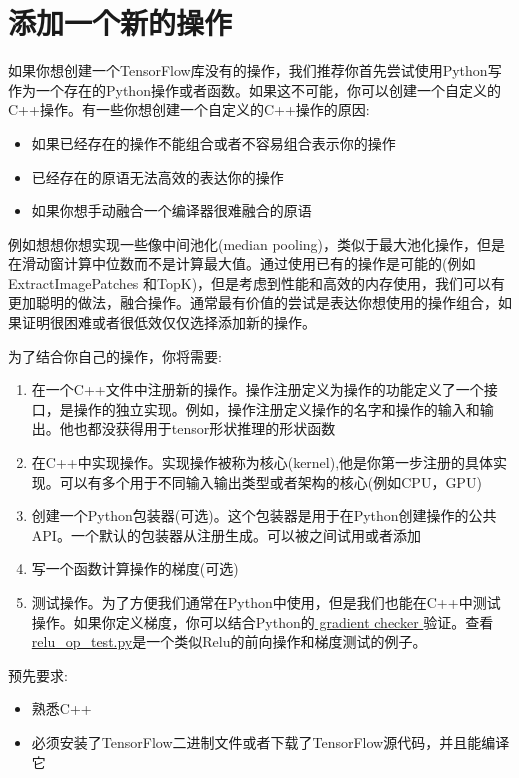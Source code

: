 \section{添加一个新的操作}
如果你想创建一个TensorFlow库没有的操作，我们推荐你首先尝试使用Python写作为一个存在的Python操作或者函数。如果这不可能，你可以创建一个自定义的C++操作。有一些你想创建一个自定义的C++操作的原因:
\begin{itemize}
	\item 如果已经存在的操作不能组合或者不容易组合表示你的操作
	\item 已经存在的原语无法高效的表达你的操作
	\item 如果你想手动融合一个编译器很难融合的原语
\end{itemize}
例如想想你想实现一些像中间池化(median pooling)，类似于最大池化操作，但是在滑动窗计算中位数而不是计算最大值。通过使用已有的操作是可能的(例如ExtractImagePatches 和TopK)，但是考虑到性能和高效的内存使用，我们可以有更加聪明的做法，融合操作。通常最有价值的尝试是表达你想使用的操作组合，如果证明很困难或者很低效仅仅选择添加新的操作。

为了结合你自己的操作，你将需要:
\begin{enumerate}
	\item 在一个C++文件中注册新的操作。操作注册定义为操作的功能定义了一个接口，是操作的独立实现。例如，操作注册定义操作的名字和操作的输入和输出。他也都没获得用于tensor形状推理的形状函数
	\item 在C++中实现操作。实现操作被称为核心(kernel),他是你第一步注册的具体实现。可以有多个用于不同输入输出类型或者架构的核心(例如CPU，GPU)
	\item 创建一个Python包装器(可选)。这个包装器是用于在Python创建操作的公共API。一个默认的包装器从注册生成。可以被之间试用或者添加
	\item 写一个函数计算操作的梯度(可选)
	\item 测试操作。为了方便我们通常在Python中使用，但是我们也能在C++中测试操作。如果你定义梯度，你可以结合Python的\href{https://www.tensorflow.org/api_docs/python/tf/test/compute_gradient_error?hl=zh-cn}{ gradient checker }验证。查看\href{https://www.github.com/tensorflow/tensorflow/blob/r1.4/tensorflow/python/kernel_tests/relu_op_test.py}{relu\_op\_test.py}是一个类似Relu的前向操作和梯度测试的例子。
\end{enumerate}
预先要求:
\begin{itemize}
\item 熟悉C++
\item 必须安装了TensorFlow二进制文件或者下载了TensorFlow源代码，并且能编译它
\end{itemize}

